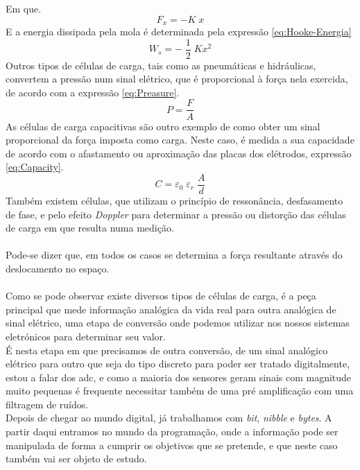 Em que.
\begin{equation}
	\label{eq:Lei-de-Hooke}
	F_x = -K \; x
\end{equation}
E a energia dissipada pela mola é determinada pela expressão \ref{eq:Hooke-Energia}
\begin{equation}
	\label{eq:Hooke-Energia}
	W_s = - \; \frac{1}{2} \; K x^2
\end{equation}
Outros tipos de células de carga, tais como as pneumáticas e hidráulicas, convertem a pressão num sinal elétrico, que é proporcional à força nela exercida, de acordo com a expressão \ref{eq:Preasure}.
\begin{equation}
	\label{eq:Preasure}
	P = \frac{F}{A}
\end{equation}
As células de carga capacitivas são outro exemplo de como obter um sinal proporcional da força imposta como carga. Neste caso, é medida a sua capacidade de acordo com o afastamento ou aproximação das placas dos elétrodos, expressão \ref{eq:Capacity}.
\begin{equation}
	\label{eq:Capacity}
	C = \varepsilon_{0} \; \varepsilon_{r} \; \frac{A}{d}
\end{equation}
Também existem células, que utilizam o princípio de ressonância, desfasamento de fase, e pelo efeito \textit{Doppler} para determinar a pressão ou distorção das células de carga em que resulta numa medição.
\\
\\
Pode-se dizer que, em todos os casos se determina a força resultante através do deslocamento no espaço.
\\
\\
Como se pode observar existe diversos tipos de células de carga, é a peça principal que mede informação analógica da vida real para outra analógica de sinal elétrico, uma etapa de conversão onde podemos utilizar nos nossos sistemas eletrónicos para determinar seu valor.
\\
É nesta etapa em que precisamos de outra conversão, de um sinal analógico elétrico para outro que seja do tipo discreto para poder ser tratado digitalmente, estou a falar dos \ac{adc}, e como a maioria dos sensores geram sinais com magnitude muito pequenas é frequente necessitar também de uma pré amplificação com uma filtragem de ruídos.
\\
Depois de chegar ao mundo digital, já trabalhamos com \textit{bit}, \textit{nibble} e \textit{bytes}. A partir daqui entramos no mundo da programação, onde a informação pode ser manipulada de forma a cumprir os objetivos que se pretende, e que neste caso também vai ser objeto de estudo.
